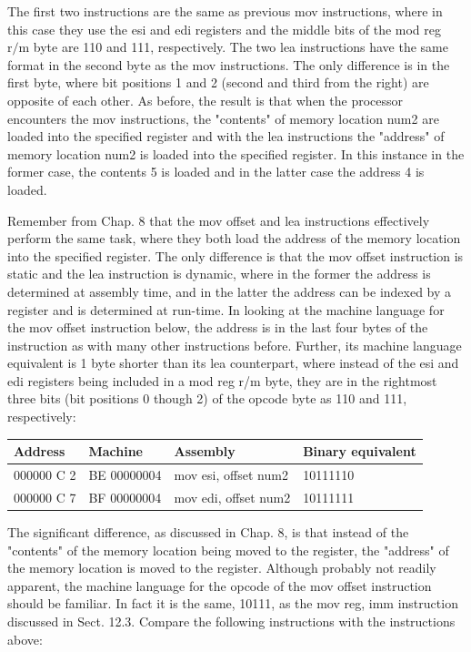 \documentclass[10pt]{article}
\begin{document}
The first two instructions are the same as previous mov instructions, where in this case they use the esi and edi registers and the middle bits of the mod reg $\mathrm{r} / \mathrm{m}$ byte are 110 and 111, respectively. The two lea instructions have the same format in the second byte as the mov instructions. The only difference is in the first byte, where bit positions 1 and 2 (second and third from the right) are opposite of each other. As before, the result is that when the processor encounters the mov instructions, the "contents" of memory location num2 are loaded into the specified register and with the lea instructions the "address" of memory location num2 is loaded into the specified register. In this instance in the former case, the contents 5 is loaded and in the latter case the address 4 is loaded.

Remember from Chap. 8 that the mov offset and lea instructions effectively perform the same task, where they both load the address of the memory location into the specified register. The only difference is that the mov offset instruction is static and the lea instruction is dynamic, where in the former the address is determined at assembly time, and in the latter the address can be indexed by a register and is determined at run-time. In looking at the machine language for the mov offset instruction below, the address is in the last four bytes of the instruction as with many other instructions before. Further, its machine language equivalent is 1 byte shorter than its lea counterpart, where instead of the esi and edi registers being included in a mod reg r/m byte, they are in the rightmost three bits (bit positions 0 though 2) of the opcode byte as 110 and 111, respectively:

\begin{center}
\begin{tabular}{|l|l|l|l|}
\hline
Address & Machine & Assembly & Binary equivalent \\
\hline
000000 C 2 & BE 00000004 & mov esi, offset num2 & 10111110 \\
\hline
000000 C 7 & BF 00000004 & mov edi, offset num2 & 10111111 \\
\hline
\end{tabular}
\end{center}

The significant difference, as discussed in Chap. 8, is that instead of the "contents" of the memory location being moved to the register, the "address" of the memory location is moved to the register. Although probably not readily apparent, the machine language for the opcode of the mov offset instruction should be familiar. In fact it is the same, 10111, as the mov reg, imm instruction discussed in Sect. 12.3. Compare the following instructions with the instructions above:
\end{document}
